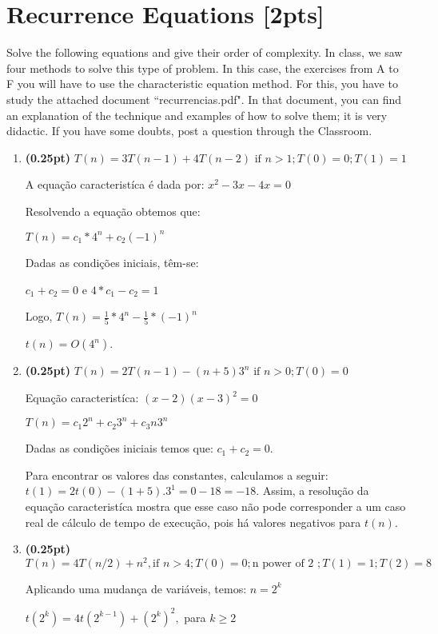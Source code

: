 \documentclass{article}
\begin{document}
\section{Recurrence Equations [2pts]}
Solve the following equations and give their order of complexity.
In class, we saw four methods to solve this type of problem. In this case, the exercises from A to F you will have to use the characteristic equation method. For this, you have to study the attached document ``recurrencias.pdf". In that document, you can find an explanation of the technique and examples of how to solve them; it is very didactic. If you have some doubts, post a question through the Classroom.


\begin{enumerate}[label=\Alph*]
  \item \textbf{(0.25pt)} $T(n) = 3T(n-1) + 4T(n-2) \mbox{ if } n>1; T(0)=0; T(1)=1$
  
 A equação caracteristíca é dada por:
 $ x^2 - 3x - 4x = 0$
 
 Resolvendo a equação obtemos que:
  
 $T(n) = c_{1}*4^{n} + c_{2}(-1)^{n}$
 
 Dadas as condições iniciais, têm-se:
 
 $c_{1} + c_{2} = 0$ e $4*c_{1} - c_{2} = 1$
 
 Logo, $T(n) = \frac{1}{5}*4^{n} - \frac{1}{5}* (-1)^{n}$
 
 $t(n) = O(4^{n})$.
  \item \textbf{(0.25pt)} $T(n) = 2T(n-1) - (n+5)3^n \mbox{ if } n>0; T(0)=0$
  
  Equação caracteristíca: $(x - 2)(x - 3)^{2} = 0$
  
  $T(n) = c_{1}2^{n} + c_{2}3^{n} + c_{3}n3^{n}$
  
  Dadas as condições iniciais temos que: $c_{1} + c_{2} = 0$. 
  
  Para encontrar os valores das constantes, calculamos a seguir:  $t(1) = 2t(0) - (1 + 5). 3^{1} = 0 - 18 = - 18$. Assim, a resolução da equação caracteristíca mostra que esse caso não pode corresponder a um caso real de cálculo de tempo de execução, pois há valores negativos para $t(n)$. 
  
  \item \textbf{(0.25pt)} $T(n) = 4T(n/2) + n^2, \mbox{if } n>4; T(0)=0; \mbox{n power of 2 }; T(1)=1; T(2)=8$
  
   Aplicando uma mudança de variáveis, temos:
   $ n = 2^{k}$
   
   $t(2^{k}) = 4t(2^{k - 1}) + (2^{k})^{2},$ para $ k \geq 2$
   

\end{enumerate}
\end{document}
